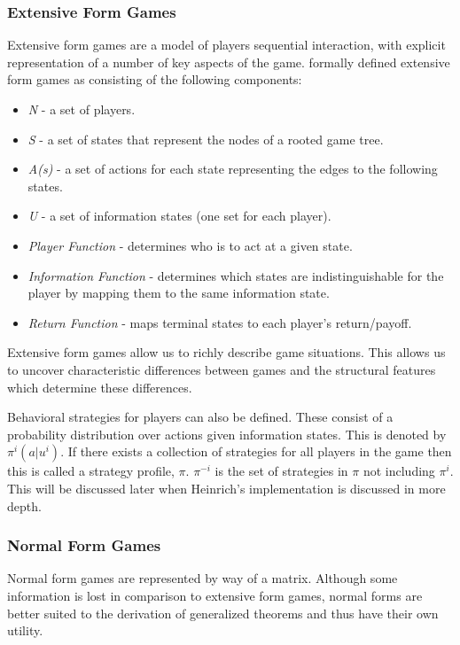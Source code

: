 \subsubsection{Extensive Form Games}
Extensive form games are a model of players sequential interaction, with explicit representation of a
number of key aspects of the game.
\citep{kuhn2016extensive} formally defined extensive form games as consisting of the following components:
\begin{itemize}
    \item \textit{N} - a set of players.
    \item \textit{S} - a set of states that represent the nodes of a rooted game tree.
    \item \textit{A(s)} - a set of actions for each state representing the edges to the following states.
    \item \textit{U} - a set of information states (one set for each player).
    \item \textit{Player Function} - determines who is to act at a given state.
    \item \textit{Information Function} - determines which states are indistinguishable for the player by mapping them to the same information state.
    \item \textit{Return Function} - maps terminal states to each player's return/payoff.
\end{itemize}

Extensive form games allow us to richly describe game situations.
This allows us to uncover characteristic differences between games and the structural features which
determine these differences\citep{kuhn2016extensive}.

Behavioral strategies for players can also be defined.
These consist of a probability distribution over actions
given information states\citep{heinrich2017reinforcement}.
This is denoted by $\pi^i(a|u^i)$.
If there exists a collection of strategies for all players in the game then this is called a strategy profile, $\pi$.
$\pi^{-i}$ is the set of strategies in $\pi$ not including $\pi^i$.
This will be discussed later when Heinrich's implementation is discussed in more depth.

\subsubsection{Normal Form Games}
Normal form games are represented by way of a matrix.
Although some information is lost in comparison to extensive form games, normal forms are
better suited to the derivation of generalized theorems\citep{kuhn2016extensive} and thus have their own utility.

